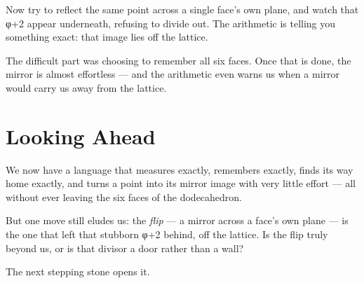 Now try to reflect the same point across a single face's own plane, and watch that φ+2 appear underneath, refusing to divide out. The arithmetic is telling you something exact: that image lies off the lattice.

The difficult part was choosing to remember all six faces. Once that is done, the mirror is almost effortless --- and the arithmetic even warns us when a mirror would carry us away from the lattice.

\section*{Looking Ahead}

We now have a language that measures exactly, remembers exactly, finds its way home exactly, and turns a point into its mirror image with very little effort --- all without ever leaving the six faces of the dodecahedron.

But one move still eludes us: the \emph{flip} --- a mirror across a face's own plane --- is the one that left that stubborn φ+2 behind, off the lattice. Is the flip truly beyond us, or is that divisor a door rather than a wall?

The next stepping stone opens it.
